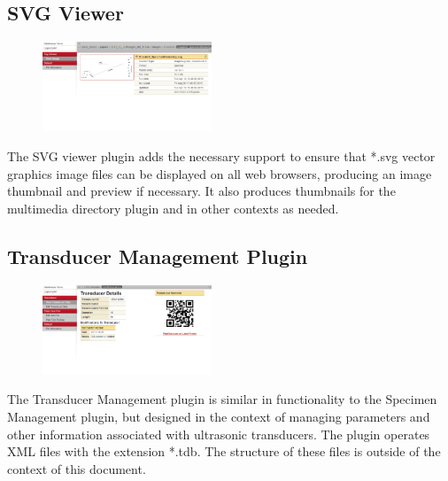 \documentclass[10pt]{article}
\begin{document}
\endgroup


\clearpage
\begingroup
\setlength\intextsep{0pt}
\subsection{SVG Viewer}
\begin{figure}
		\includegraphics[width=0.45\textwidth]{SVG_Viewer.png}
\end{figure}
The SVG viewer plugin adds the necessary support to ensure that *.svg vector graphics image files can be displayed on all web browsers, producing an image thumbnail and preview if necessary.  It also produces thumbnails for the multimedia directory plugin and in other contexts as needed.

\endgroup



\begingroup
\setlength\intextsep{0pt}
\subsection{Transducer Management Plugin}
\begin{figure}
		\includegraphics[width=0.45\textwidth]{Transducer_Management.png}
\end{figure}
The Transducer Management plugin is similar in functionality to the Specimen Management plugin, but designed in the context of managing parameters and other information associated with ultrasonic transducers.  The plugin operates XML files with the extension *.tdb.  The structure of these files is outside of the context of this document.

\endgroup



\begingroup
\setlength\intextsep{0pt}
\end{document}
